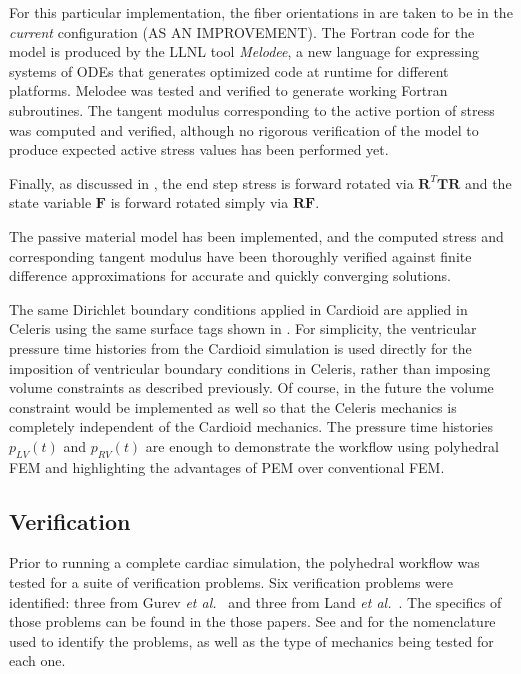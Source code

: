 
%
%
For this particular implementation, the fiber orientations in  are taken to be in the \textit{current} configuration (AS AN IMPROVEMENT). The Fortran code for the model is produced by the LLNL tool \textit{Melodee}, a new language for expressing systems of ODEs that generates optimized code at runtime for different platforms. Melodee was tested and verified to generate working Fortran subroutines. The tangent modulus corresponding to the active portion of stress was computed and verified, although no rigorous verification of the model to produce expected active stress values has been performed yet.

Finally, as discussed in , the end step stress is forward rotated via $\bm{R}^T \bm{T} \bm{R}$ and the state variable $\bm{F}$ is forward rotated simply via $\bm{R}\bm{F}$.

The passive material model has been implemented, and the computed stress and corresponding tangent modulus have been thoroughly verified against finite difference approximations for accurate and quickly converging solutions.


The same Dirichlet boundary conditions applied in Cardioid are applied in Celeris using the same surface tags shown in . For simplicity, the ventricular pressure time histories from the Cardioid simulation is used directly for the imposition of ventricular boundary conditions in Celeris, rather than imposing volume constraints as described previously. Of course, in the future the volume constraint would be implemented as well so that the Celeris mechanics is completely independent of the Cardioid mechanics. The pressure time histories $p_{LV}(t)$ and $p_{RV}(t)$ are enough to demonstrate the workflow using polyhedral FEM and highlighting the advantages of PEM over conventional FEM.

\subsection{Verification}

Prior to running a complete cardiac simulation, the polyhedral workflow was tested for a suite of verification problems. Six verification problems were identified: three from Gurev \textit{et al.}~\cite{gurev_2015} and three from Land \textit{et al.}~\cite{land_2015}. The specifics of those problems can be found in the those papers. See  and  for the nomenclature used to identify the problems, as well as the type of mechanics being tested for each one.

